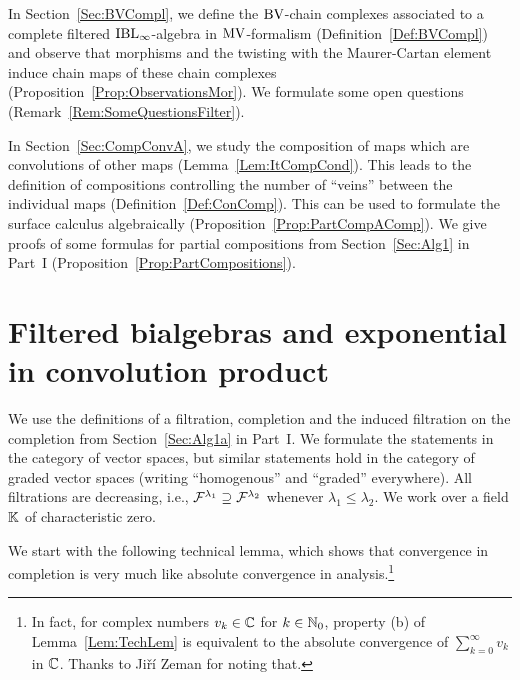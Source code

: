 \documentclass[\MainFolder/Text.tex]{subfiles}
\begin{document}
In Section~\ref{Sec:BVCompl}, we define the $\mathrm{BV}$-chain complexes associated to a complete filtered $\mathrm{IBL}_\infty$-algebra in $\mathrm{MV}$-formalism (Definition~\ref{Def:BVCompl}) and observe that morphisms and the twisting with the Maurer-Cartan element induce chain maps of these chain complexes (Proposition~\ref{Prop:ObservationsMor}). We formulate some open questions (Remark~\ref{Rem:SomeQuestionsFilter}).

In Section~\ref{Sec:CompConvA}, we study the composition of maps which are convolutions of other maps (Lemma~\ref{Lem:ItCompCond}). This leads to the definition of compositions controlling the number of ``veins'' between the individual maps (Definition~\ref{Def:ConComp}). This can be used to formulate the surface calculus algebraically (Proposition~\ref{Prop:PartCompAComp}). We give proofs of some formulas for partial compositions from Section~\ref{Sec:Alg1} in Part~I (Proposition~\ref{Prop:PartCompositions}).


\section{Filtered bialgebras and exponential in convolution product}\label{Sec:DetailsOnFiltr}

We use the definitions of a filtration, completion and the induced filtration on the completion from Section~\ref{Sec:Alg1a} in Part~I. We formulate the statements in the category of vector spaces, but similar statements hold in the category of graded vector spaces (writing ``homogenous'' and ``graded'' everywhere). All filtrations are decreasing, i.e., $\mathcal{F}^{\lambda_1} \supseteq \mathcal{F}^{\lambda_2}$ whenever $\lambda_1 \le \lambda_2$.
We work over a field $\mathbb{K}$ of characteristic zero.

We start with the following technical lemma, which shows that convergence in completion is very much like absolute convergence in analysis.\footnote{In fact, for complex numbers $v_k\in \mathbb{C}$ for $k\in\mathbb{N}_0$, property (b) of Lemma~\ref{Lem:TechLem} is equivalent to the absolute convergence of $\sum_{k=0}^\infty v_k$ in $\mathbb{C}$.
Thanks to Ji\v r\'i Zeman for noting that.}
 
\end{document}
